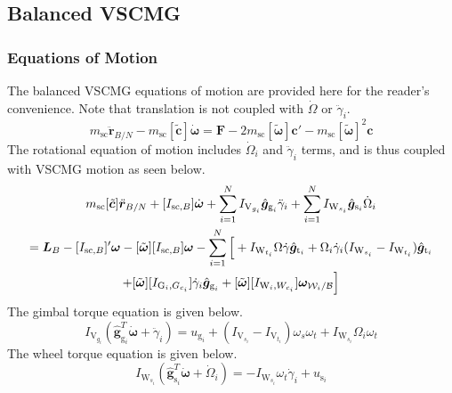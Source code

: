 \subsection{Balanced VSCMG}
\subsubsection{Equations of Motion}
The balanced VSCMG equations of motion are provided here for the reader's convenience. Note that translation is not coupled with $\dot{\Omega}$ or $\ddot{\gamma}_i$.
\begin{equation}\label{eq:vscmgTranslationSimpleBS_BACKSUBAPP}
m_\text{sc}\ddot{\bm r}_{B/N} - m_\text{sc}[\tilde{\bm{c}}]\dot{\bm \omega} 
= \bm{F} - 2m_\text{sc}[\tilde{\bm{\omega}}]\bm{c}' - m_\text{sc}[\tilde{\bm{\omega}}]^2\bm{c} 
\end{equation}
The rotational equation of motion includes $\dot{\Omega}_i$ and $\ddot{\gamma}_i$ terms, and is thus coupled with VSCMG motion as seen below.
\begin{multline}
m_{\text{\text{sc}}}[\tilde{\bm{c}}]\ddot{\bm r}_{B/N} + [I_{\text{sc},B}]\dot{\bm\omega}
+\sum\limits_{i=1}^{N}I_{\text{V}_{g_i}}\hat{\bm{g}}_{\text{g}_i} \ddot{\gamma}_i
+\sum\limits_{i=1}^{N}I_{\text{W}_{s_i}}\hat{\bm{g}}_{\text{s}_i} \dot{\Omega}_i
\\
= \bm{L}_B - [I_{\text{sc},B}]'\bm{\omega} - [\tilde{\bm\omega}][I_{\text{sc},B}]\bm\omega
-\sum\limits_{i=1}^{N} \Big[ 
+ I_{\text{W}_{t_i}}\Omega\dot{\gamma}\hat{\bm{g}}_{\text{t}_i} + \Omega_i\dot{\gamma}_i(I_{\text{W}_{s_i}}-I_{\text{W}_{t_i}})\hat{\bm{g}}_{\text{t}_i} \\+ [\tilde{\bm\omega}][I_{\text{G}_i,G_{c_i}}]\dot{\gamma}_i\hat{\bm{g}}_{\text{g}_i} + [\tilde{\bm{\omega}}][I_{\text{W}_i,W_{c_i}}]\bm{\omega}_{\mathcal{W}_i/\cal B}
\Big]
\label{eq:vscmgRotationSimpleBS_BACKSUBAPP}
\end{multline}
The gimbal torque equation is given below.
\begin{equation}
I_{\text{V}_{g_i}}(\hat{\bm g}_{\text{g}_i}^T\dot{\bm{\omega}}
+  \ddot{\gamma}_i)
= u_{\text{g}_i} + (I_{\text{V}_{s_i}}-I_{\text{V}_{t_i}})\omega_s\omega_t + I_{\text{W}_{s_i}}\Omega_i\omega_t
\label{eq:vscmgGimbalTorqueSimpleBS_BACKSUBAPP}
\end{equation}
The wheel torque equation is given below.
\begin{equation}
I_{\text{W}_{s_i}}(\hat{\bm g}_{\text{s}_i}^T\dot{\bm\omega} + \dot{\Omega}_i)
=-I_{\text{W}_{s_i}}\omega_t\dot{\gamma}_i + u_{\text{s}_i}
\label{eq:vscmgWheelTorqueSimpleBS_BACKSUBAPP}
\end{equation} 

